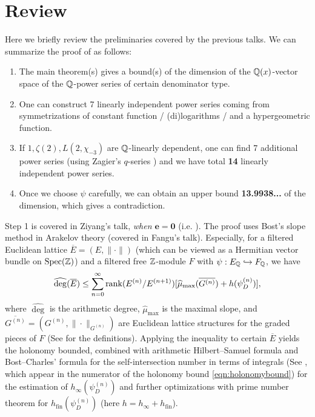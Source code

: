 \section{Review}

Here we briefly review the preliminaries covered by the previous talks.
We can summarize the proof of \cite[Theorem A]{calegari2024linear} as follows:
\begin{enumerate}
    \item The main theorem(s) \cite[Theorem 6.0.2, Theorem 7.0.1, Theorem 7.1.6]{calegari2024linear} gives a bound(s) of the dimension of the $\mathbb{Q}(x)$-vector space of the $\mathbb{Q}$-power series of certain denominator type.
    \item One can construct 7 linearly independent power series coming from symmetrizations of constant function / (di)logarithms / and a hypergeometric function.
    \item If $1, \zeta(2), L(2, \chi_{-3})$ are $\mathbb{Q}$-linearly dependent, one can find 7 additional power series (using Zagier's $q$-series \cite{zagier2009integral}) and we have total \textbf{14} linearly independent power series.
    \item Once we choose $\psi$ carefully, we can obtain an upper bound \textbf{13.9938...} of the dimension, which gives a contradiction.
\end{enumerate}

Step 1 is covered in Ziyang's talk, \emph{when $\mathbf{e} = \mathbf{0}$} (i.e. \cite[Theorem 2.5.1]{calegari2024linear}).
The proof uses Bost's slope method in Arakelov theory \cite{bost2001algebraic} (covered in Fangu's talk).
Especially, for a filtered Euclidean lattice $\overline{E} = (E, \|\cdot\|)$ (which can be viewed as a Hermitian vector bundle on $\mathrm{Spec}(\mathbb{Z})$) and a filtered free $\mathbb{Z}$-module $F$ with $\psi: E_{\mathbb{Q}} \hookrightarrow F_{\mathbb{Q}}$, we have
\begin{equation}
\label{eqn:bostineq}
    \widehat{\deg}(\overline{E}) \le \sum_{n=0}^{\infty} \mathrm{rank} (E^{(n)} / E^{(n+1)}) [\widehat{\mu}_{\mathrm{max}}(\overline{G^{(n)}}) + h (\psi_D^{(n)})],
\end{equation}
where $\widehat{\deg}$ is the arithmetic degree, $\widehat{\mu}_{\mathrm{max}}$ is the maximal slope, and $\overline{G^{(n)}} = (G^{(n)}, \|\cdot\|_{G^{(n)}})$ are Euclidean lattice structures for the graded pieces of $F$ (See \cite[Section 7.2]{calegari2024linear} for the definitions).
Applying the inequality to certain $\overline{E}$ yields the holonomy bounded, combined with arithmetic Hilbert--Samuel formula and Bost--Charles' formula for the self-intersection number in terms of integrals (See \cite[Lemma 7.4.5]{calegari2024linear}, which appear in the numerator of the holonomy bound \eqref{eqn:holonomybound}) for the estimation of $h_{\infty}(\psi_D^{(n)})$ and further optimizations with prime number theorem for $h_{\mathrm{fin}}(\psi_D^{(n)})$ (here $h = h_\infty +  h_{\mathrm{fin}}$).

